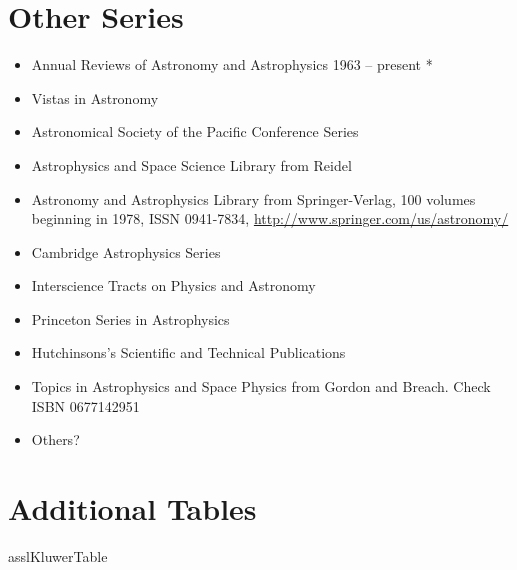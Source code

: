 \documentclass[letterpaper]{article}
\begin{document}
\section{Other Series}

\begin{itemize}
  \item Annual Reviews of Astronomy and Astrophysics 1963 -- present *
  \item Vistas in Astronomy
  \item Astronomical Society of the Pacific Conference Series
  \item Astrophysics and Space Science Library from Reidel
  \item Astronomy and Astrophysics Library from Springer-Verlag, 100 volumes beginning in 1978, ISSN 0941-7834, \url{http://www.springer.com/us/astronomy/}
  \item Cambridge Astrophysics Series
  \item Interscience Tracts on Physics and Astronomy
  \item Princeton Series in Astrophysics
  \item Hutchinsons's Scientific and Technical Publications
  \item Topics in Astrophysics and Space Physics from Gordon and Breach. Check ISBN 0677142951
  \item Others?
\end{itemize}

\section{Additional Tables}

{asslKluwerTable}
\end{document}

